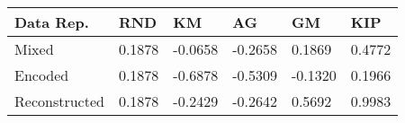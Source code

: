 \begin{tabular}{llllll}
\toprule
Data Rep. & RND & KM & AG & GM & KIP \\
\midrule
Mixed & 0.1878 & -0.0658 & -0.2658 & 0.1869 & 0.4772 \\
Encoded & 0.1878 & -0.6878 & -0.5309 & -0.1320 & 0.1966 \\
Reconstructed & 0.1878 & -0.2429 & -0.2642 & 0.5692 & 0.9983 \\
\bottomrule
\end{tabular}
